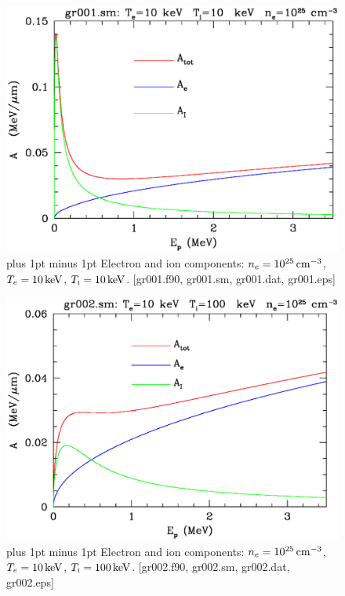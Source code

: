 \documentclass[preprint,12pt,eqsecnum,nofootinbib,amsmath,amssymb]{revtex4}
\newcommand{\smI}{{\rm\scriptscriptstyle I}}
\newcommand{\footnoteskip}{\baselineskip 12pt plus 1pt minus 1pt}
\begin{document}
\vskip-2.5cm 
\begin{figure}[h!]
\includegraphics[scale=0.45]{gr001.eps} 
\vskip-0.8cm 
\caption{\footnoteskip  
  Electron and ion components: $n_e=10^{25}\,{\rm cm^{-3}}$,
  $T_e=10\,{\rm keV}$, $T_\smI=10\,{\rm keV}$. [gr001.f90, gr001.sm,
  gr001.dat, gr001.eps] 
}
\label{fig:gr001}
\end{figure}

\vskip-2cm 
\begin{figure}[h!]
\includegraphics[scale=0.45]{gr002.eps} 
\vskip-0.8cm 
\caption{\footnoteskip  
  Electron and ion components: $n_e=10^{25}\,{\rm cm^{-3}}$,
  $T_e=10\,{\rm keV}$, $T_\smI=100\,{\rm keV}$. [gr002.f90, gr002.sm,
  gr002.dat, gr002.eps] 
}
\label{fig:gr002}
\end{figure}
\end{document}
